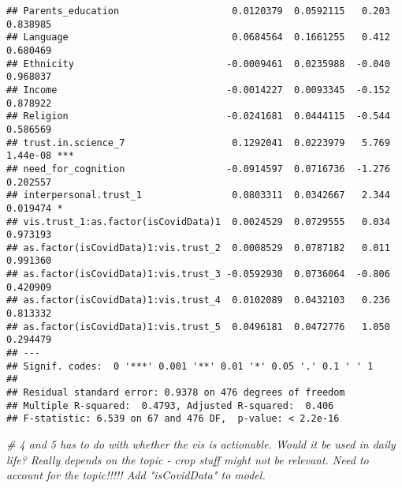 \documentclass[
]{article}
\newenvironment{Shaded}{\begin{snugshade}}{\end{snugshade}}
\newcommand{\CommentTok}[1]{\textcolor[rgb]{0.56,0.35,0.01}{\textit{#1}}}
\begin{document}
\begin{verbatim}
## Parents_education                    0.0120379  0.0592115   0.203 0.838985    
## Language                             0.0684564  0.1661255   0.412 0.680469    
## Ethnicity                           -0.0009461  0.0235988  -0.040 0.968037    
## Income                              -0.0014227  0.0093345  -0.152 0.878922    
## Religion                            -0.0241681  0.0444115  -0.544 0.586569    
## trust.in.science_7                   0.1292041  0.0223979   5.769 1.44e-08 ***
## need_for_cognition                  -0.0914597  0.0716736  -1.276 0.202557    
## interpersonal.trust_1                0.0803311  0.0342667   2.344 0.019474 *  
## vis.trust_1:as.factor(isCovidData)1  0.0024529  0.0729555   0.034 0.973193    
## as.factor(isCovidData)1:vis.trust_2  0.0008529  0.0787182   0.011 0.991360    
## as.factor(isCovidData)1:vis.trust_3 -0.0592930  0.0736064  -0.806 0.420909    
## as.factor(isCovidData)1:vis.trust_4  0.0102089  0.0432103   0.236 0.813332    
## as.factor(isCovidData)1:vis.trust_5  0.0496181  0.0472776   1.050 0.294479    
## ---
## Signif. codes:  0 '***' 0.001 '**' 0.01 '*' 0.05 '.' 0.1 ' ' 1
## 
## Residual standard error: 0.9378 on 476 degrees of freedom
## Multiple R-squared:  0.4793, Adjusted R-squared:  0.406 
## F-statistic: 6.539 on 67 and 476 DF,  p-value: < 2.2e-16
\end{verbatim}

\begin{Shaded}
\begin{Highlighting}[]
\CommentTok{\# 4 and 5 has to do with whether the vis is actionable. Would it be used in daily life? Really depends on the topic {-} crop stuff might not be relevant. Need to account for the topic!!!!! Add "isCovidData" to model. }
\end{Highlighting}
\end{Shaded}
\end{document}
